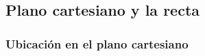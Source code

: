 \documentclass[12pt,examen,answers]{repaso_layout}
\begin{document}
\begin{questions}
	\newpage
	\subsection{Plano cartesiano y la recta}

	\subsubsection{Ubicación en el plano cartesiano}










\end{questions}
\end{document}
